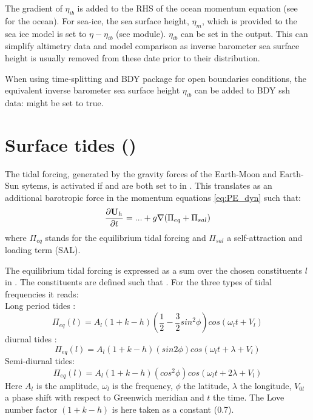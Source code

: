 \documentclass[../tex_main/NEMO_manual]{subfiles}
\begin{document}
The gradient of $\eta_{ib}$ is added to the RHS of the ocean momentum equation (see  for the ocean).
For sea-ice, the sea surface height, $\eta_m$, which is provided to the sea ice model is set to $\eta - \eta_{ib}$
(see  module).
$\eta_{ib}$ can be set in the output.
This can simplify altimetry data and model comparison as
inverse barometer sea surface height is usually removed from these date prior to their distribution.

When using time-splitting and BDY package for open boundaries conditions,
the equivalent inverse barometer sea surface height $\eta_{ib}$ can be added to BDY ssh data: 
  might be set to true.

\section{Surface tides (\protect{})}
\label{sec:SBC_tide}



The tidal forcing, generated by the gravity forces of the Earth-Moon and Earth-Sun sytems,
is activated if  and  are both set to  in .
This translates as an additional barotropic force in the momentum equations \ref{eq:PE_dyn} such that:
\begin{equation}     \label{eq:PE_dyn_tides}
\frac{\partial {\rm {\bf U}}_h }{\partial t}= ...
+g\nabla (\Pi_{eq} + \Pi_{sal}) 
\end{equation} 
where $\Pi_{eq}$ stands for the equilibrium tidal forcing and $\Pi_{sal}$ a self-attraction and loading term (SAL). 
 
The equilibrium tidal forcing is expressed as a sum over the chosen constituents $l$ in .
The constituents are defined such that .
For the three types of tidal frequencies it reads: \\
Long period tides :
\begin{equation}
\Pi_{eq}(l)=A_{l}(1+k-h)(\frac{1}{2}-\frac{3}{2}sin^{2}\phi)cos(\omega_{l}t+V_{l})
\end{equation}
diurnal tides :
\begin{equation}
\Pi_{eq}(l)=A_{l}(1+k-h)(sin 2\phi)cos(\omega_{l}t+\lambda+V_{l})
\end{equation}
Semi-diurnal tides:
\begin{equation}
\Pi_{eq}(l)=A_{l}(1+k-h)(cos^{2}\phi)cos(\omega_{l}t+2\lambda+V_{l})
\end{equation}
Here $A_{l}$ is the amplitude, $\omega_{l}$ is the frequency, $\phi$ the latitude, $\lambda$ the longitude,
$V_{0l}$ a phase shift with respect to Greenwich meridian and $t$ the time.
The Love number factor $(1+k-h)$ is here taken as a constant (0.7).
\end{document}
